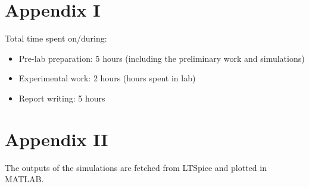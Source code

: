 \documentclass[letterpaper,12pt]{article}
\begin{document}
\section*{Appendix I}
Total time spent on/during:
\begin{itemize}
	\item Pre-lab preparation: 5 hours (including the preliminary work and simulations) 
	\item Experimental work: 2 hours (hours spent in lab)
	\item Report writing: 5 hours 
\end{itemize}
\section*{Appendix II}
The outputs of the simulations are fetched from LTSpice and plotted in MATLAB. 



\end{document}
